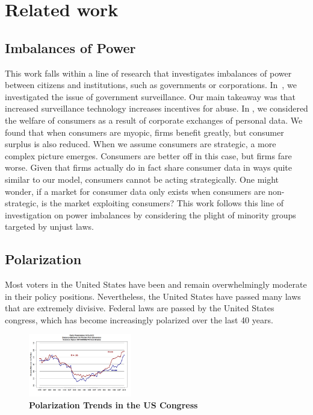 
\section{Related work}
\label{sec:related}

\subsection{Imbalances of Power}
This work falls within a line of research that investigates imbalances of power between citizens and institutions, such as governments or corporations. In~\cite{laskowskigovernment}, we investigated the issue of government surveillance.  Our main takeaway was that increased surveillance technology increases incentives for abuse. In  \cite{johnsoncaviar}, we considered the welfare of consumers as a result of corporate exchanges of personal data.
We found that when consumers are myopic, firms benefit greatly, but consumer surplus is also reduced. When we assume consumers are strategic, a more complex picture emerges. Consumers are better off in this case, but firms fare worse.  Given that firms actually do in fact share consumer data in ways quite similar to our model, consumers cannot be acting strategically.  One might wonder, if a market for consumer data only exists when consumers are non-strategic, is the market exploiting consumers?  This work follows this line of investigation on power imbalances by considering the plight of minority groups targeted by unjust laws.

\subsection{Polarization}
Most voters in the United States have been and remain overwhelmingly moderate in their policy positions\cite{layman2006party}. Nevertheless, the United States have passed many laws that are extremely divisive.  Federal laws are passed by the United States congress, which has become increasingly polarized over the last 40 years.
\begin{figure}[htbp]
\begin{center}
\includegraphics[width=0.4\textwidth]{figs/polar_house_and_senate_46-115_july_11}
\caption{{\bf Polarization Trends in the US Congress}}
\label{fig:uscongress}
\end{center}
\end{figure}

